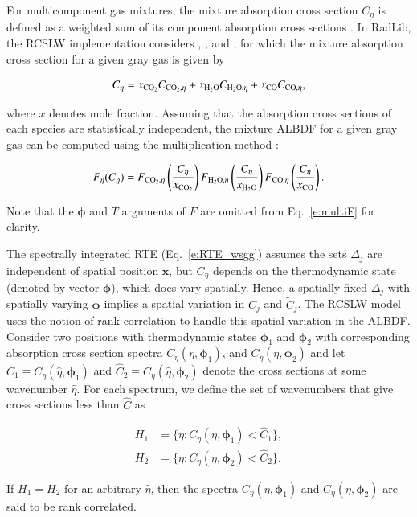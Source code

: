 \documentclass[preprint,12pt]{elsarticle}
\newcommand{\BS}{\boldsymbol}
\begin{document}
For multicomponent gas mixtures, the mixture absorption cross section $C_{\eta}$ is defined as a weighted sum of its component absorption cross sections \cite{Solovjov_2000}.
In RadLib, the RCSLW implementation considers , , and , for which the mixture absorption cross section for a given gray gas is given by
%
\begin{linenomath}
\begin{equation} \label{e:multiC}
C_{\eta} = x_{\ce{CO2}}C_{\ce{CO2},\eta} + x_{\ce{H2O}}C_{\ce{H2O},\eta} + x_{\ce{CO}}C_{\ce{CO},\eta},
\end{equation}
\end{linenomath}
%
where $x$ denotes mole fraction.
Assuming that the absorption cross sections of each species are statistically independent, the mixture ALBDF for a given gray gas can be computed using the multiplication method \cite{Solovjov_2000}:
%
\begin{linenomath}
\begin{equation} \label{e:multiF}
F_{\eta}(C_{\eta}) = F_{\ce{CO2},\eta} \left( \frac{C_{\eta}}{x_{\ce{CO2}}} \right) F_{\ce{H2O},\eta} \left( \frac{C_{\eta}}{x_{\ce{H2O}}} \right) F_{\ce{CO},\eta} \left( \frac{C_{\eta}}{x_{\ce{CO}}} \right).
\end{equation}
\end{linenomath}
%
Note that the $\BS{\phi}$ and $T$ arguments of $F$ are omitted from Eq.~\ref{e:multiF} for clarity.

The spectrally integrated RTE (Eq.~\ref{e:RTE_wsgg}) assumes the sets $\Delta_j$ are independent of spatial position $\mathbf{x}$, but $C_\eta$ depends on the thermodynamic state (denoted by vector $\BS{\phi}$), which does vary spatially.
Hence, a spatially-fixed $\Delta_j$ with spatially varying $\BS{\phi}$ implies a spatial variation in $C_j$ and $\tilde{C}_j$.
The RCSLW model uses the notion of rank correlation to handle this spatial variation in the ALBDF.
Consider two positions with thermodynamic states $\BS{\phi}_1$ and $\BS{\phi}_2$ with corresponding absorption cross section spectra $C_\eta(\eta,\BS{\phi}_1)$, and $C_\eta(\eta,\BS{\phi}_2)$ and let $\hat{C}_1\equiv C_\eta(\hat{\eta},\BS{\phi}_1)$ and $\hat{C}_2\equiv C_\eta(\hat{\eta},\BS{\phi}_2)$ denote the cross sections at some wavenumber $\hat{\eta}$. For each spectrum, we define the set of wavenumbers that give cross sections less than $\hat{C}$ as
%
\begin{linenomath}
\begin{align}
H_1&=\{\eta: C_\eta(\eta,\BS{\phi}_1)<\hat{C}_1\}, \\
H_2&=\{\eta: C_\eta(\eta,\BS{\phi}_2)<\hat{C}_2\}.
\end{align}
\end{linenomath}
%
If $H_1=H_2$ for an arbitrary $\hat{\eta}$, then the spectra $C_\eta(\eta,\BS{\phi}_1)$ and $C_\eta(\eta,\BS{\phi}_2)$ are said to be rank correlated.
\end{document}
